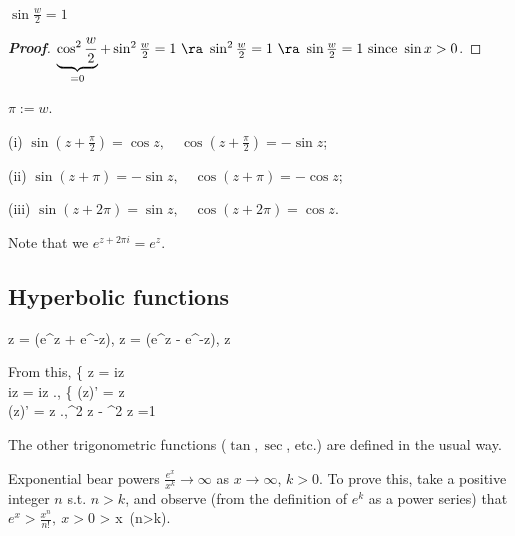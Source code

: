 \begin{corollary}
$\sin \frac w2 = 1$ 
\end{corollary}

\begin{proof}[{\bf Proof}]
$\underbrace{\cos^2 \frac w2}_{=0} + \sin^2 \frac w2 = 1 \ \ra \ \sin^2 \frac w2 = 1 \ \ra \ \sin \frac w2 = 1 \text{ since } \sin x>0$.
\end{proof}

\begin{definition}
$\pi := w$.
\end{definition}

\begin{theorem}
(i) $\sin(z + \frac {\pi}2) = \cos z,\quad \cos(z + \frac {\pi}2) = - \sin z$;

(ii) $\sin(z + \pi) = -\sin z,\quad \cos(z + \pi) = - \cos z$;

(iii) $\sin(z + 2\pi) = \sin z,\quad \cos(z + 2\pi) = \cos z$.
\end{theorem}

Note that we $e^{z+2\pi i} = e^z$.

\subsection{Hyperbolic functions}

\be
\cosh z = (e^z + e^{-z}), \quad \sinh z = (e^z - e^{-z}), \quad z\in\C
\ee

From this, 
\be
\left\{
\cosh z = \cos iz\\
i\sinh z = \sin iz
\ea\right.,\quad 
\left\{
(\cosh z)' = \sinh z\\
(\sinh z)' = \cosh z
\ea\right.,\quad \cosh^2 z - \sinh^2 z =1
\ee

\begin{remark}
\ben
\item The other trigonometric functions ($\tan, \sec$, etc.) are defined in the usual way.

\item Exponential bear powers $\frac{e^x}{x^k}\to \infty$ as $x\to\infty$, $k>0$. To prove this, take a positive integer $n$ s.t. $n>k$, and observe (from the definition of $e^k$ as a power series) that $e^x>\frac{x^n}{n!},\ x>0$
\be
{} >  \to \infty {} x\to \infty\ (n>k).
\ee 

\een
\end{remark}



